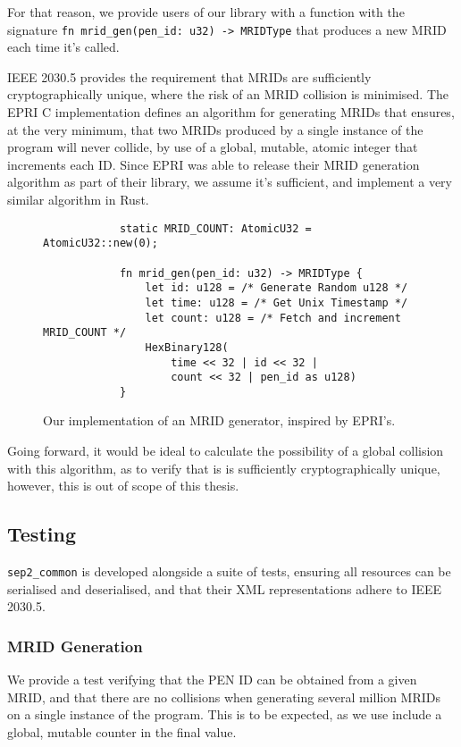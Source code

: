 For that reason, we provide users of our library with a function with the signature \texttt{fn mrid\_gen(pen\_id: u32) -> MRIDType} that produces a new MRID each time it's called.

IEEE 2030.5 provides the requirement that MRIDs are sufficiently cryptographically unique, where the risk of an MRID collision is minimised. The EPRI C implementation defines an algorithm for generating MRIDs that ensures, at the very minimum, that two MRIDs produced by a single instance of the program will never collide, by use of a global, mutable, atomic integer that increments each ID. Since EPRI was able to release their MRID generation algorithm as part of their library, we assume it's sufficient, and implement a very similar algorithm in Rust.

\begin{figure}[H]
    \begin{center}
        \begin{lstlisting}
            static MRID_COUNT: AtomicU32 = AtomicU32::new(0);

            fn mrid_gen(pen_id: u32) -> MRIDType {
                let id: u128 = /* Generate Random u128 */
                let time: u128 = /* Get Unix Timestamp */
                let count: u128 = /* Fetch and increment MRID_COUNT */
                HexBinary128(
                    time << 32 | id << 32 | 
                    count << 32 | pen_id as u128)
            }
        \end{lstlisting}
        \label{fig:mridgenalgo}
        \caption{Our implementation of an MRID generator, inspired by EPRI's.}
    \end{center}
\end{figure}


Going forward, it would be ideal to calculate the possibility of a global collision with this algorithm, as to verify that is is sufficiently cryptographically unique, however, this is out of scope of this thesis.

\subsection{Testing}
\texttt{sep2\_common} is developed alongside a suite of tests, ensuring all resources can be serialised and deserialised, and that their XML representations adhere to IEEE 2030.5.

\subsubsection{MRID Generation}
We provide a test verifying that the PEN ID can be obtained from a given MRID, and that there are no collisions when generating several million MRIDs on a single instance of the program. This is to be expected, as we use include a global, mutable counter in the final value.

